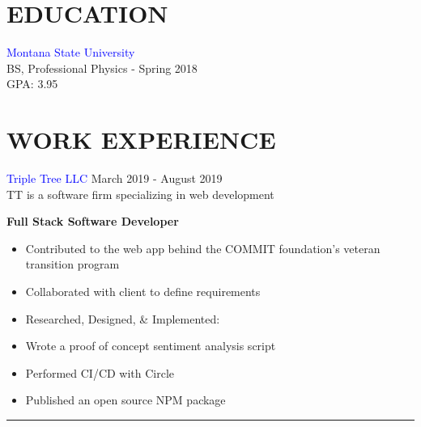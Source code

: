 \documentclass[12pt]{resume}
\begin{document}
    \begin{minipage}[t]{0.48\textwidth}

        {\section* {EDUCATION}}
        \textcolor{blue}{Montana State University} \\
        BS, Professional Physics - Spring 2018\\
        GPA: 3.95

        {\section* {WORK EXPERIENCE}}
        \textcolor{blue}{Triple Tree LLC} {\hfill March 2019 - August 2019} \\
        TT is a software firm specializing in web development
        \begin{spacing}{1.2}
            {\bf Full Stack Software Developer}
        \end{spacing}
        \vspace{-.5mm}
        \begin{itemize}
            \setlength\itemsep{.2em}
            \item {Contributed to the web app behind the COMMIT foundation's veteran transition
                program}
            \item {Collaborated with client to define requirements}
            \item {Researched, Designed, \& Implemented:}
            \item {Wrote a proof of concept sentiment analysis script}
            \item {Performed CI/CD with Circle}
            \item {Published an open source NPM package}
        \end{itemize}

        \vspace{-.5em}
        \rule{\textwidth}{0.1pt}
        \vspace{.1em}


\end{minipage}
\end{document}
